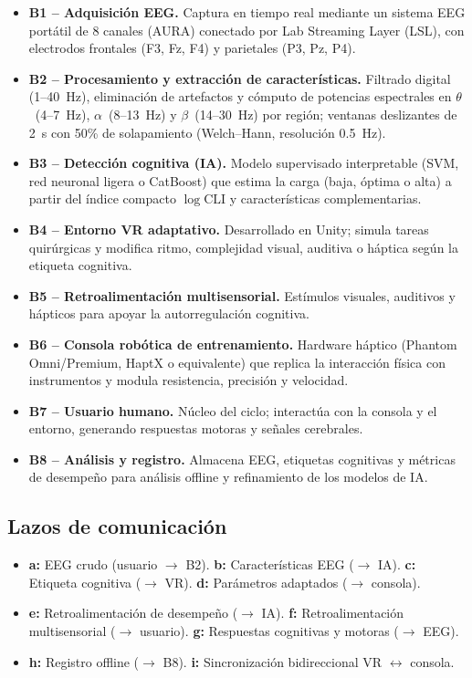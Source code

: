 \documentclass[12pt]{article}
\begin{document}
\begin{itemize}
    \item \textbf{B1 -- Adquisición EEG.} Captura en tiempo real
    mediante un sistema EEG portátil de 8 canales (AURA)
    conectado por Lab Streaming Layer (LSL), con electrodos
    frontales (F3, Fz, F4) y parietales (P3, Pz, P4).
    \item \textbf{B2 -- Procesamiento y extracción de
    características.} Filtrado digital (1--40~Hz), eliminación de
    artefactos y cómputo de potencias espectrales en
    $\theta$~(4--7~Hz), $\alpha$~(8--13~Hz) y $\beta$~(14--30~Hz)
    por región; ventanas deslizantes de 2~s con 50\% de
    solapamiento (Welch--Hann, resolución 0.5~Hz).
    \item \textbf{B3 -- Detección cognitiva (IA).} Modelo
    supervisado interpretable (SVM, red neuronal ligera o
    CatBoost) que estima la carga (baja, óptima o alta) a partir
    del índice compacto $\log\mathrm{CLI}$ y características
    complementarias.
    \item \textbf{B4 -- Entorno VR adaptativo.} Desarrollado en
    Unity; simula tareas quirúrgicas y modifica ritmo,
    complejidad visual, auditiva o háptica según la etiqueta
    cognitiva.
    \item \textbf{B5 -- Retroalimentación multisensorial.}
    Estímulos visuales, auditivos y hápticos para apoyar la
    autorregulación cognitiva.
    \item \textbf{B6 -- Consola robótica de entrenamiento.}
    Hardware háptico (Phantom Omni/Premium, HaptX o equivalente)
    que replica la interacción física con instrumentos y modula
    resistencia, precisión y velocidad.
    \item \textbf{B7 -- Usuario humano.} Núcleo del ciclo;
    interactúa con la consola y el entorno, generando respuestas
    motoras y señales cerebrales.
    \item \textbf{B8 -- Análisis y registro.} Almacena EEG,
    etiquetas cognitivas y métricas de desempeño para análisis
    offline y refinamiento de los modelos de IA.
\end{itemize}

\subsection{Lazos de comunicación}

\begin{itemize}
    \item \textbf{a:} EEG crudo (usuario $\to$ B2). \textbf{b:}
    Características EEG ($\to$ IA). \textbf{c:} Etiqueta cognitiva
    ($\to$ VR). \textbf{d:} Parámetros adaptados ($\to$ consola).
    \item \textbf{e:} Retroalimentación de desempeño ($\to$ IA).
    \textbf{f:} Retroalimentación multisensorial ($\to$ usuario).
    \textbf{g:} Respuestas cognitivas y motoras ($\to$ EEG).
    \item \textbf{h:} Registro offline ($\to$ B8). \textbf{i:}
    Sincronización bidireccional VR $\leftrightarrow$ consola.
\end{itemize}
\end{document}
